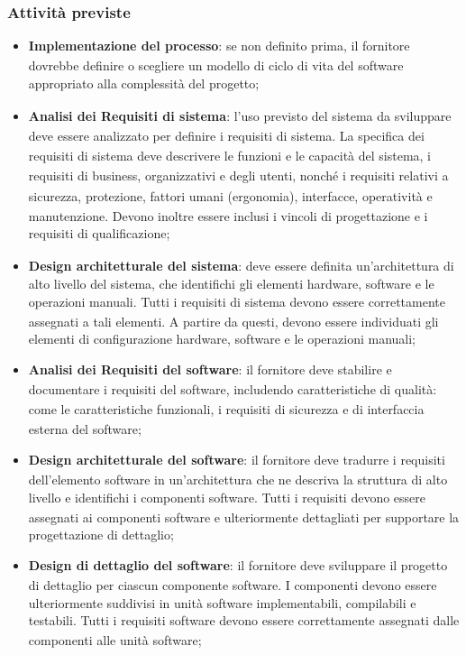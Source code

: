 \documentclass[a4paper,11pt]{article}
\newcommand{\G}{\textsubscript{\scalebox{0.6}{\textbf{G}}}}
\begin{document}
\subsubsection{Attività previste}
\begin{itemize}
    \item \textbf{Implementazione\G{} del processo}: se non definito prima, il fornitore dovrebbe definire o scegliere un modello di ciclo di vita del software appropriato alla complessità del progetto\G{};
    \item \textbf{Analisi dei Requisiti\G{} di sistema}: l'uso previsto del sistema da sviluppare deve essere analizzato per definire i requisiti\G{} di sistema. La specifica dei requisiti\G{} di sistema deve descrivere le funzioni e le capacità del sistema, i requisiti\G{} di business, organizzativi e degli utenti, nonché i requisiti\G{} relativi a sicurezza\G{}, protezione, fattori umani (ergonomia), interfacce, operatività e manutenzione. Devono inoltre essere inclusi i vincoli di progettazione e i requisiti\G{} di qualificazione;
    \item \textbf{Design architetturale del sistema}: deve essere definita un'architettura di alto livello del sistema, che identifichi gli elementi hardware, software e le operazioni manuali. Tutti i requisiti\G{} di sistema devono essere correttamente assegnati a tali elementi. A partire da questi, devono essere individuati gli elementi di configurazione hardware, software e le operazioni manuali;
    \item \textbf{Analisi dei Requisiti\G{} del software}: il fornitore deve stabilire e documentare i requisiti\G{} del software, includendo caratteristiche di qualità\G{}: come le caratteristiche funzionali, i requisiti\G{} di sicurezza\G{} e di interfaccia\G{} esterna del software;
    \item \textbf{Design architetturale del software}: il fornitore deve tradurre i requisiti\G{} dell'elemento software in un'architettura che ne descriva la struttura di alto livello e identifichi i componenti software. Tutti i requisiti\G{} devono essere assegnati ai componenti software e ulteriormente dettagliati per supportare la progettazione di dettaglio;
    \item \textbf{Design di dettaglio del software}: il fornitore deve sviluppare il progetto\G{} di dettaglio per ciascun componente software. I componenti devono essere ulteriormente suddivisi in unità software implementabili, compilabili e testabili. Tutti i requisiti\G{} software devono essere correttamente assegnati dalle componenti alle unità software;

\end{itemize}
\end{document}
